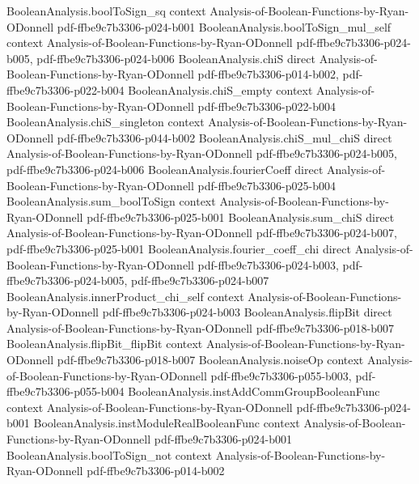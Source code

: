 \begin{lemma}
\proofstep
  {BooleanAnalysis.boolToSign_sq}
  {context}
  {Analysis-of-Boolean-Functions-by-Ryan-ODonnell}
  {pdf-ffbe9c7b3306-p024-b001}
\proofstep
  {BooleanAnalysis.boolToSign_mul_self}
  {context}
  {Analysis-of-Boolean-Functions-by-Ryan-ODonnell}
  {pdf-ffbe9c7b3306-p024-b005,
    pdf-ffbe9c7b3306-p024-b006}
\proofstep
  {BooleanAnalysis.chiS}
  {direct}
  {Analysis-of-Boolean-Functions-by-Ryan-ODonnell}
  {pdf-ffbe9c7b3306-p014-b002,
    pdf-ffbe9c7b3306-p022-b004}
\proofstep
  {BooleanAnalysis.chiS_empty}
  {context}
  {Analysis-of-Boolean-Functions-by-Ryan-ODonnell}
  {pdf-ffbe9c7b3306-p022-b004}
\proofstep
  {BooleanAnalysis.chiS_singleton}
  {context}
  {Analysis-of-Boolean-Functions-by-Ryan-ODonnell}
  {pdf-ffbe9c7b3306-p044-b002}
\proofstep
  {BooleanAnalysis.chiS_mul_chiS}
  {direct}
  {Analysis-of-Boolean-Functions-by-Ryan-ODonnell}
  {pdf-ffbe9c7b3306-p024-b005,
    pdf-ffbe9c7b3306-p024-b006}
\proofstep
  {BooleanAnalysis.fourierCoeff}
  {direct}
  {Analysis-of-Boolean-Functions-by-Ryan-ODonnell}
  {pdf-ffbe9c7b3306-p025-b004}
\proofstep
  {BooleanAnalysis.sum_boolToSign}
  {context}
  {Analysis-of-Boolean-Functions-by-Ryan-ODonnell}
  {pdf-ffbe9c7b3306-p025-b001}
\proofstep
  {BooleanAnalysis.sum_chiS}
  {direct}
  {Analysis-of-Boolean-Functions-by-Ryan-ODonnell}
  {pdf-ffbe9c7b3306-p024-b007,
    pdf-ffbe9c7b3306-p025-b001}
\proofstep
  {BooleanAnalysis.fourier_coeff_chi}
  {direct}
  {Analysis-of-Boolean-Functions-by-Ryan-ODonnell}
  {pdf-ffbe9c7b3306-p024-b003,
    pdf-ffbe9c7b3306-p024-b005,
    pdf-ffbe9c7b3306-p024-b007}
\proofstep
  {BooleanAnalysis.innerProduct_chi_self}
  {context}
  {Analysis-of-Boolean-Functions-by-Ryan-ODonnell}
  {pdf-ffbe9c7b3306-p024-b003}
\proofstep
  {BooleanAnalysis.flipBit}
  {direct}
  {Analysis-of-Boolean-Functions-by-Ryan-ODonnell}
  {pdf-ffbe9c7b3306-p018-b007}
\proofstep
  {BooleanAnalysis.flipBit_flipBit}
  {context}
  {Analysis-of-Boolean-Functions-by-Ryan-ODonnell}
  {pdf-ffbe9c7b3306-p018-b007}
\proofstep
  {BooleanAnalysis.noiseOp}
  {context}
  {Analysis-of-Boolean-Functions-by-Ryan-ODonnell}
  {pdf-ffbe9c7b3306-p055-b003,
    pdf-ffbe9c7b3306-p055-b004}
\proofstep
  {BooleanAnalysis.instAddCommGroupBooleanFunc}
  {context}
  {Analysis-of-Boolean-Functions-by-Ryan-ODonnell}
  {pdf-ffbe9c7b3306-p024-b001}
\proofstep
  {BooleanAnalysis.instModuleRealBooleanFunc}
  {context}
  {Analysis-of-Boolean-Functions-by-Ryan-ODonnell}
  {pdf-ffbe9c7b3306-p024-b001}
\proofstep
  {BooleanAnalysis.boolToSign_not}
  {context}
  {Analysis-of-Boolean-Functions-by-Ryan-ODonnell}
  {pdf-ffbe9c7b3306-p014-b002}

\end{lemma}
